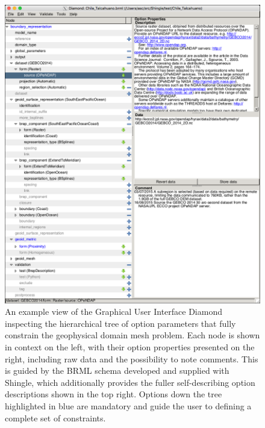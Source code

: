 \documentclass[a4paper, 10pt]{book}
\providecommand{\shingle}{Shingle\xspace}
\providecommand{\brml}{BRML\xspace}
\begin{document}
\begin{figure}[!h]
\begin{center}
\includegraphics[width=\columnwidth]{fig/gui.png}
\end{center}
\caption{%
An example view of the Graphical User Interface Diamond
inspecting the
hierarchical tree of option parameters that fully constrain the
geophysical domain mesh problem.
%
Each node is shown in context on the left,
with their
option properties presented on the right,
%
including
raw data
and the possibility to
note comments.
%
This is guided by the \brml schema
developed and supplied with \shingle,
which additionally provides the fuller
self-describing
option descriptions
shown in the top right.
%
Options down the tree highlighted in blue are
mandatory
%
and guide the user to defining a complete set of constraints.
}
\label{fig:gui}
\end{figure}
%
\end{document}
